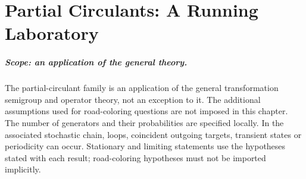 \chapter{Partial Circulants: A Running Laboratory}
\label{organized:ptc}
\label{chapter-ptc-laboratory}
\paragraph{Scope: an application of the general theory.}
The partial-circulant family is an application of the general transformation
semigroup and operator theory, not an exception to it. The additional
assumptions used for road-coloring questions are not imposed in this
chapter. The number of generators and their probabilities are specified
locally. In the associated stochastic chain, loops, coincident outgoing
targets, transient states or periodicity can occur. Stationary and limiting
statements use the hypotheses stated with each result; road-coloring
hypotheses must not be imported implicitly.











